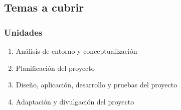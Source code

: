 \begin{frame}
\section{Temas a cubrir}
\frametitle{Unidades}
\begin{enumerate}

\item Análisis de entorno y conceptualización

\item Planificación del proyecto

\item Diseño, aplicación, desarrollo y pruebas del proyecto

\item Adaptación y divulgación del proyecto

\end{enumerate}

\end{frame}
